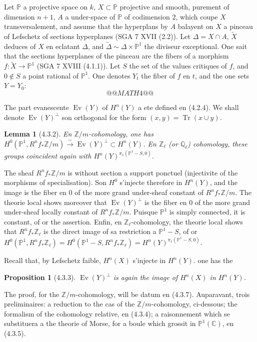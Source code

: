 \documentclass[12pt,a4paper]{article}
\theoremstyle{plain}
\newtheorem{lemma}[theorem]{Lemma}
\newtheorem{proposition}[theorem]{Proposition}
\theoremstyle{definition}
\theoremstyle{remark}
\DeclareMathOperator{\Tr}{Tr}
\DeclareMathOperator{\Ev}{Ev}
\newcommand{\bbZ}{\mathbb{Z}}
\newcommand{\bbC}{\mathbb{C}}
\newcommand{\bbP}{\mathbb{P}}
\newcommand{\Zl}{\mathbb{Z}_\ell}
\newcommand{\Ql}{\mathbb{Q}_\ell}
\begin{document}
Let $\bbP$ a projective space on $k$, $X \subset \bbP$ projective and smooth, purement of dimension $n+1$, $A$ a under-space of $\bbP$ of codimension $2$, which coupe $X$ transversalement, and assume that the hyperplans by $A$ balayent on $X$ a pinceau of Lefschetz of sections hyperplanes (SGA 7 XVII (2.2)). Let $\Delta = X \cap A$, $\widetilde{X}$ deduces of $X$ en eclatant $\Delta$, and $\widetilde{\Delta} \sim \Delta \times \bbP^1$ the diviseur exceptional. One sait that the sections hyperplanes of the pinceau are the fibers of a morphism $f : \widetilde{X} \to \bbP^1$ (SGA 7 XVIII (4.1.1)). Let $S$ the set of the values critiques of $f$, and $0 \notin S$ a point rational of $\bbP^1$. One denotes $Y_t$ the fiber of $f$ en $t$, and the one sets $Y = Y_0$:
\[
@@MATH4@@
\tag{4.3.1.1}
\]

The part evanescente $\Ev(Y)$ of $H^n(Y)$ a ete defined en (4.2.4). We shall denote $\Ev(Y)^\perp$ son orthogonal for the form $(x, y) = \Tr(x \cup y)$.

\begin{lemma}[4.3.2]
En $\bbZ/m$-cohomology, one has $H^0(\bbP^1, R^n f_* \bbZ/m) \xrightarrow{\sim} \Ev(Y)^\perp \subset H^n(Y)$. En $\Zl$ (or $\Ql$) cohomology, these groups coincident again with $H^n(Y)^{\pi_1(\bbP^1 - S, 0)}$.
\end{lemma}

The sheaf $R^n f_* \bbZ/m$ is without section a support ponctuel (injectivite of the morphisms of specialisation). Son $H^0$ s'injecte therefore in $H^n(Y)$, and the image is the fiber en $0$ of the more grand under-sheaf constant of $R^n f_* \bbZ/m$. The theorie local shows moreover that $\Ev(Y)^\perp$ is the fiber en $0$ of the more grand under-sheaf locally constant of $R^n f_* \bbZ/m$. Puisque $\bbP^1$ is simply connected, it is constant, of or the assertion. Enfin, en $\Zl$-cohomology, the theorie local shows that $R^n f_* \Zl$ is the direct image of sa restriction a $\bbP^1 - S$, of or $H^0(\bbP^1, R^n f_* \Zl) = H^0(\bbP^1 - S, R^n f_* \Zl) = H^n(Y)^{\pi_1(\bbP^1 - S, 0)}$.

Recall that, by Lefschetz faible, $H^n(X)$ s'injecte in $H^n(Y)$. one has the

\begin{proposition}[4.3.3]
$\Ev(Y)^\perp$ is again the image of $H^n(X)$ in $H^n(Y)$.
\end{proposition}

The proof, for the $\bbZ/m$-cohomology, will be datum en (4.3.7). Auparavant, trois preliminaires: a reduction to the cas of the $\bbZ/m$-cohomology, ci-dessous; the formalism of the cohomology relative, en (4.3.4); a raisonnement which se substituera a the theorie of Morse, for a boule which grossit in $\bbP^1(\bbC)$, en (4.3.5).
\end{document}
